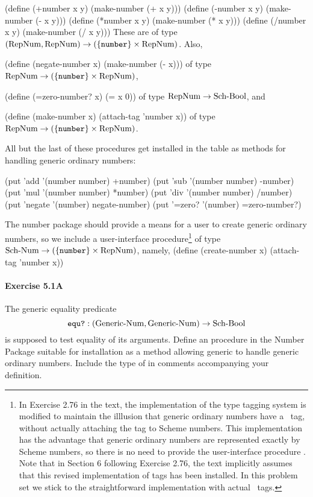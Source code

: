 \beginlisp
(define (+number x y) (make-number (+ x y)))
(define (-number x y) (make-number (- x y)))
(define (*number x y) (make-number (* x y)))
(define (/number x y) (make-number (/ x y)))
\endlisp
These are of type $(\mbox{RepNum}, \mbox{RepNum}) \rightarrow (\{\mbox{\tt number}\}\times\mbox{RepNum})$.  Also,

\beginlisp
(define (negate-number x) (make-number (- x)))
\endlisp
of type $\mbox{RepNum} \rightarrow (\{\mbox{\tt number}\}\times\mbox{RepNum})$,

\beginlisp
(define (=zero-number? x) (= x 0))
\endlisp
of type $\mbox{RepNum} \rightarrow \mbox{Sch-\-Bool}$, and

\beginlisp
(define (make-number x) (attach-tag 'number x))
\endlisp
of type $\mbox{RepNum} \rightarrow (\{\mbox{\tt number}\}\times\mbox{RepNum})$.

All but the last of these procedures get installed in the table as methods
for handling generic ordinary numbers:

\beginlisp
(put 'add '(number number) +number)
(put 'sub '(number number) -number)
(put 'mul '(number number) *number)
(put 'div '(number number) /number)
(put 'negate '(number) negate-number)
(put '=zero? '(number) =zero-number?)
\endlisp

The number package should provide a means for a user to create generic
ordinary numbers, so we include a user-interface procedure\footnote{In
Exercise 2.76 in the text, the implementation of the type tagging system
is modified to maintain the illlusion that generic ordinary numbers have a
\numtag\ tag, without actually attaching the tag to Scheme numbers.  This
implementation has the advantage that generic ordinary numbers are
represented exactly by Scheme numbers, so there is no need to provide the
user-interface procedure .  Note that in Section 6
following Exercise 2.76, the text implicitly assumes that this revised
implementation of tags has been installed.  In this problem set we stick
to the straightforward implementation with actual \numtag\ tags.} of type
$\mbox{Sch-\-Num} \rightarrow (\{\mbox{\tt number}\}\times\mbox{RepNum})$, namely,
\beginlisp
(define (create-number x) (attach-tag 'number x))
\endlisp

\paragraph{Exercise 5.1A}
The generic equality predicate
\[\mbox{\tt equ?}:(\mbox{Generic-\-Num},\mbox{Generic-\-Num}) \rightarrow \mbox{Sch-\-Bool}\]
is supposed to test equality of its arguments.  Define an 
procedure in the Number Package suitable for installation as a method
allowing generic  to handle generic ordinary numbers.  Include
the type of  in comments accompanying your definition.

